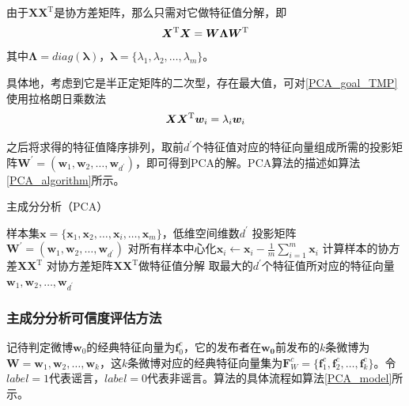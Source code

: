 \documentclass[a4paper,AutoFakeBold,oneside,12pt]{book}
\begin{document}
由于$\bm{X}\bm{X}^ \mathrm{ T }$是协方差矩阵，那么只需对它做特征值分解，即
\begin{equation}
	\label{PCA_eigenvalue}
	\bm{X}^ \mathrm{ T }\bm{X} = \bm{W}\bm{\Lambda}\bm{W}^ \mathrm{ T } \\
\end{equation}
其中$\bm{\Lambda}=diag(\bm{\lambda})$，$\bm{\lambda} = \{\lambda_1,\lambda_2,\ldots,\lambda_m\}$。

具体地，考虑到它是半正定矩阵的二次型，存在最大值，可对\eqref{PCA_goal_TMP}使用拉格朗日乘数法
\begin{equation}
	\bm{X}\bm{X}^ \mathrm{ T }\bm{w}_i  = \lambda_i \bm{w}_i \\
\end{equation}

之后将求得的特征值降序排列，取前$d^\prime$个特征值对应的特征向量组成所需的投影矩阵$\bm{W}^\prime =(\bm{w}_1,\bm{w}_2,\ldots,\bm{w}_{d^\prime})$，即可得到PCA的解。PCA算法的描述如算法\ref{PCA_algorithm}所示。

\begin{algorithm}
	\begin{spacing}{1.3}
		\caption{主成分分析（PCA）}
		\label{PCA_algorithm}
		\renewcommand{\algorithmicrequire}{\textbf{输入：}}
		\renewcommand{\algorithmicensure}{\textbf{输出：}}
		\begin{algorithmic}[1]
			\Require 样本集$\bm{x}=\{\bm{x}_1,\bm{x}_2,\ldots,\bm{x}_i,\ldots,\bm{x}_m\}$，低维空间维数$d^\prime$
			\Ensure 投影矩阵  $\bm{W}^\prime =(\bm{w}_1,\bm{w}_2,\ldots,\bm{w}_{d^\prime})$
			\State 对所有样本中心化$\bm{x}_i \gets \bm{x}_i - \frac{1}{m}\sum_{i=1}^m \bm{x}_i$
			\State  计算样本的协方差$\bm{X}\bm{X}^ \mathrm{T}$
			\State 对协方差矩阵$\bm{X}\bm{X}^ \mathrm{T}$做特征值分解
			\State 取最大的$d^\prime$个特征值所对应的特征向量$\bm{w}_1,\bm{w}_2,\ldots,\bm{w}_{d^\prime}$
		\end{algorithmic}
	\end{spacing}
\end{algorithm}

\subsubsection{主成分分析可信度评估方法}
记待判定微博$\bm{w}_0$的经典特征向量为$\bm{f}^{c}_{0}$，它的发布者在$\bm{w_0}$前发布的$k$条微博为$\bm{W} = \bm{w}_1,\bm{w}_2,\ldots,\bm{w}_k$，这$k$条微博对应的经典特征向量集为$\bm{F}^{c}_{W} = \{ \bm{f}^{c}_{1},\bm{f}^{c}_{2},\ldots,\bm{f}^{c}_{k} \}$。令$label = 1$代表谣言，$label = 0$代表非谣言。算法的具体流程如算法\ref{PCA_model}所示。
\end{document}
